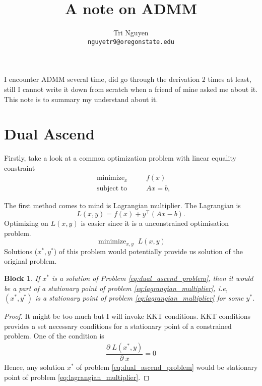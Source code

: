\documentclass[11pt,a4paper]{article}
\title{A note on ADMM}
\author{	Tri Nguyen \\
        \texttt{nguyetr9@oregonstate.edu} \\
        }
\DeclareMathOperator*{\minimize}{minimize}
\theoremstyle{plain}
\newtheorem{block}{Block}[section]
\theoremstyle{definition}
\theoremstyle{remark}
\begin{document}
\maketitle

I encounter ADMM several time, did go through the derivation 2 times at least, still I cannot write it down from scratch when a friend of mine asked me about it. This note is to summary my understand about it.

\section{Dual Ascend}%
Firstly, take a look at a common optimization problem with linear equality constraint
\begin{subequations}
\label{eq:dual_ascend_problem}
\begin{alignat}{2}
    & \minimize_{x} \quad && f(x) \\
    & \text{subject to} && Ax = b,
\end{alignat}
\end{subequations}

The first method comes to mind is Lagrangian multiplier. 
The Lagrangian is 
\[
L(x, y) = f(x) + y^{\!\top\!} (Ax - b).
\]
Optimizing on $L(x, y)$ is easier since it is a unconstrained optimisation problem.
\begin{equation}
\label{eq:lagrangian_multiplier}
\minimize_{x, y} \; L(x, y)
\end{equation} 
Solutions ($x^{*}, y^{*}$) of this problem would potentially provide us solution of the original problem.

\begin{block}
If $x^{*}$ is a solution of Problem \eqref{eq:dual_ascend_problem}, then it would be a part of a stationary point of problem \eqref{eq:lagrangian_multiplier}, i.e, $(x^{*}, y^{*})$ is a stationary point of problem \eqref{eq:lagrangian_multiplier} for some $y^{*}$.
\end{block}
\begin{proof}
    It might be too much but I will invoke KKT conditions. KKT conditions provides a set necessary conditions for a stationary point of a constrained problem. One of the condition is
\begin{align*}
\dfrac{\partial\; L(x^{*}, y)}{\partial\; x} = 0
\end{align*}
Hence, any solution $x^{*}$ of problem \ref{eq:dual_ascend_problem} would be stationary point of problem \eqref{eq:lagrangian_multiplier}.

\end{proof}
\end{document}
